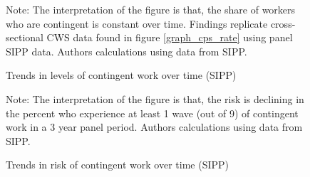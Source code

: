 \documentclass[12pt]{article}
\begin{document}
\begin{figure}[htp!]
    \caption{Trends in levels of contingent work over time (SIPP)}
    \label{graph_sipp_rate}
    \footnotesize{Note: The interpretation of the figure is that, the share of workers who are contingent is constant over time.  Findings replicate cross-sectional CWS data found in figure \ref{graph_cps_rate} using panel SIPP data.  Authors calculations using data from SIPP.}
\end{figure}

\begin{figure}[htp!]
    \caption{Trends in risk of contingent work over time (SIPP)}
    \label{graph_sipp_risk}
    \footnotesize{Note: The interpretation of the figure is that, the risk is declining in the percent who experience at least 1 wave (out of 9) of contingent work in a 3 year panel period.  Authors calculations using data from SIPP.}
\end{figure}
\end{document}

